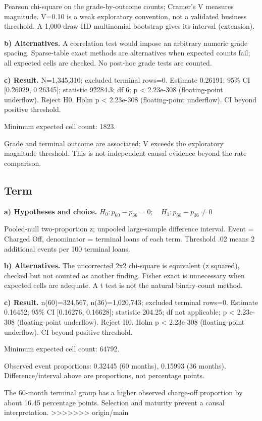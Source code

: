 \documentclass[10pt,a4paper,twocolumn]{article}
\begin{document}
Pearson chi-square on the grade-by-outcome counts; Cramer's V measures magnitude. V=0.10 is a weak exploratory convention, not a validated business threshold. A 1,000-draw IID multinomial bootstrap gives its interval (extension).

\textbf{b) Alternatives.} A correlation test would impose an arbitrary numeric grade spacing. Sparse-table exact methods are alternatives when expected counts fail; all expected cells are checked. No post-hoc grade tests are counted.

\textbf{c) Result.} N=1,345,310; excluded terminal rows=0. Estimate 0.26191; 95\% CI [0.26029, 0.26345]; statistic 92284.3; df 6; p < 2.23e-308 (floating-point underflow). Reject H0. Holm p < 2.23e-308 (floating-point underflow). CI beyond positive threshold.

Minimum expected cell count: 1823.

Grade and terminal outcome are associated; V exceeds the exploratory magnitude threshold. This is not independent causal evidence beyond the rate comparison.


\subsection{Term}
\textbf{a) Hypotheses and choice.} \(H_0:p_{60}-p_{36}=0;\quad H_1:p_{60}-p_{36}\ne0\)

Pooled-null two-proportion z; unpooled large-sample difference interval. Event = Charged Off, denominator = terminal loans of each term. Threshold .02 means 2 additional events per 100 terminal loans.

\textbf{b) Alternatives.} The uncorrected 2x2 chi-square is equivalent (z squared), checked but not counted as another finding. Fisher exact is unnecessary when expected cells are adequate. A t test is not the natural binary-count method.

\textbf{c) Result.} n(60)=324,567, n(36)=1,020,743; excluded terminal rows=0. Estimate 0.16452; 95\% CI [0.16276, 0.16628]; statistic 204.25; df not applicable; p < 2.23e-308 (floating-point underflow). Reject H0. Holm p < 2.23e-308 (floating-point underflow). CI beyond positive threshold.

Minimum expected cell count: 64792.

Observed event proportions: 0.32445 (60 months), 0.15993 (36 months). Difference/interval above are proportions, not percentage points.

The 60-month terminal group has a higher observed charge-off proportion by about 16.45 percentage points. Selection and maturity prevent a causal interpretation.
>>>>>>> origin/main
\end{document}
